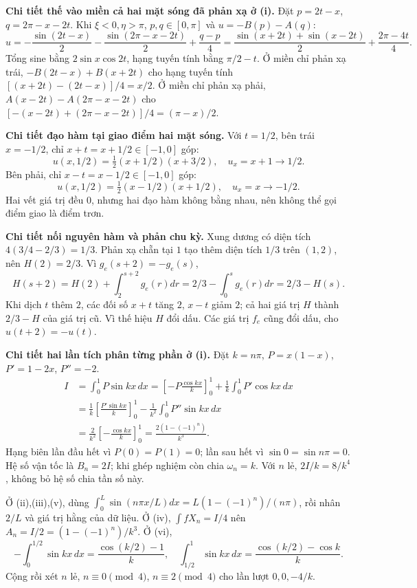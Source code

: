 \textbf{Chi tiết thế vào miền cả hai mặt sóng đã phản xạ ở (i).} Đặt $p=2t-x$, $q=2\pi-x-2t$. Khi $\xi<0,\eta>\pi$, $p,q\in[0,\pi]$ và $u=-B(p)-A(q)$:
\[u=-\frac{\sin(2t-x)}2-\frac{\sin(2\pi-x-2t)}2+\frac{q-p}{4}
=\frac{\sin(x+2t)+\sin(x-2t)}2+\frac{2\pi-4t}{4}.\]
Tổng sine bằng $2\sin x\cos2t$, hạng tuyến tính bằng $\pi/2-t$. Ở miền chỉ phản xạ trái, $-B(2t-x)+B(x+2t)$ cho hạng tuyến tính $[(x+2t)-(2t-x)]/4=x/2$. Ở miền chỉ phản xạ phải, $A(x-2t)-A(2\pi-x-2t)$ cho $[-(x-2t)+(2\pi-x-2t)]/4=(\pi-x)/2$.

\textbf{Chi tiết đạo hàm tại giao điểm hai mặt sóng.} Với $t=1/2$, bên trái $x=-1/2$, chỉ $x+t=x+1/2\in[-1,0]$ góp:
\[u(x,1/2)=\tfrac12(x+1/2)(x+3/2),\quad u_x=x+1\to1/2.\]
Bên phải, chỉ $x-t=x-1/2\in[-1,0]$ góp:
\[u(x,1/2)=\tfrac12(x-1/2)(x+1/2),\quad u_x=x\to-1/2.\]
Hai vết giá trị đều $0$, nhưng hai đạo hàm không bằng nhau, nên không thể gọi điểm giao là điểm trơn.

\textbf{Chi tiết nối nguyên hàm và phản chu kỳ.} Xung dương có diện tích $4(3/4-2/3)=1/3$. Phản xạ chẵn tại $1$ tạo thêm diện tích $1/3$ trên $(1,2)$, nên $H(2)=2/3$. Vì $g_e(s+2)=-g_e(s)$,
\[H(s+2)=H(2)+\int_2^{s+2}g_e(r)dr=2/3-\int_0^sg_e(r)dr=2/3-H(s).\]
Khi dịch $t$ thêm $2$, các đối số $x+t$ tăng $2$, $x-t$ giảm $2$; cả hai giá trị $H$ thành $2/3-H$ của giá trị cũ. Vì thế hiệu $H$ đổi dấu. Các giá trị $f_e$ cũng đổi dấu, cho $u(t+2)=-u(t)$.

\textbf{Chi tiết hai lần tích phân từng phần ở (i).} Đặt $k=n\pi$, $P=x(1-x)$, $P'=1-2x$, $P''=-2$.
\[\begin{aligned}
I&=\int_0^1P\sin kx\,dx
=\left[-P\frac{\cos kx}{k}\right]_0^1+\frac1k\int_0^1P'\cos kx\,dx\\
&=\frac1k\left[\frac{P'\sin kx}{k}\right]_0^1-\frac1{k^2}\int_0^1P''\sin kx\,dx\\
&=\frac2{k^2}\left[-\frac{\cos kx}{k}\right]_0^1=\frac{2(1-(-1)^n)}{k^3}.
\end{aligned}\]
Hạng biên lần đầu hết vì $P(0)=P(1)=0$; lần sau hết vì $\sin0=\sin n\pi=0$. Hệ số vận tốc là $B_n=2I$; khi ghép nghiệm còn chia $\omega_n=k$. Với $n$ lẻ, $2I/k=8/k^4$, không bỏ hệ số chia tần số này.

Ở (ii),(iii),(v), dùng $\int_0^L\sin(n\pi x/L)dx=L(1-(-1)^n)/(n\pi)$, rồi nhân $2/L$ và giá trị hằng của dữ liệu. Ở (iv), $\int fX_n=I/4$ nên $A_n=I/2=(1-(-1)^n)/k^3$. Ở (vi),
\[-\int_0^{1/2}\sin kx\,dx=\frac{\cos(k/2)-1}{k},\quad
\int_{1/2}^1\sin kx\,dx=\frac{\cos(k/2)-\cos k}{k}.\]
Cộng rồi xét $n$ lẻ, $n\equiv0\pmod4$, $n\equiv2\pmod4$ cho lần lượt $0,0,-4/k$.


